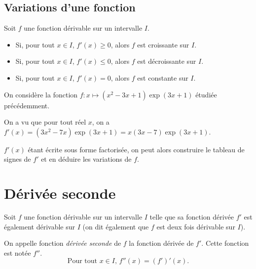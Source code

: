\documentclass[11pt,fleqn, openany]{book} %
\begin{document}
\subsection{Variations d'une fonction}

\begin{proposition}Soit $f$ une fonction dérivable sur un intervalle $I$.
\begin{itemize}
\item Si, pour tout $x\in I$, $f'(x) \geqslant 0$, alors $f$ est croissante sur $I$.
\item Si, pour tout $x\in I$, $f'(x) \leqslant 0$, alors $f$ est décroissante sur $I$.
\item Si, pour tout $x\in I$, $f'(x) =0$, alors $f$ est constante sur $I$.
\end{itemize}\end{proposition}

\begin{example}On considère la fonction $f:x\mapsto (x^2-3x+1)\exp(3x+1)$ étudiée précédemment. 

On a vu que pour tout réel $x$, on a $f'(x)=(3x^2-7x)\exp(3x+1)=x(3x-7)\exp(3x+1)$.

$f'(x)$ étant écrite sous forme factorisée, on peut alors construire le tableau de signes de $f'$ et en déduire les variations de $f$.


\vskip220pt


\end{example}


\section{Dérivée seconde}

\begin{definition} Soit $f$ une fonction dérivable sur un intervalle $I$ telle que sa fonction dérivée $f'$ est également dérivable sur $I$ (on dit également  que $f$ est deux fois dérivable sur $I$).

On appelle fonction \textit{dérivée seconde} de $f$ la fonction dérivée de $f'$. Cette fonction est notée $f''$.
\[ \text{Pour tout } x \in I, \, f''(x)=(f')'(x).\]\end{definition}
\end{document}
